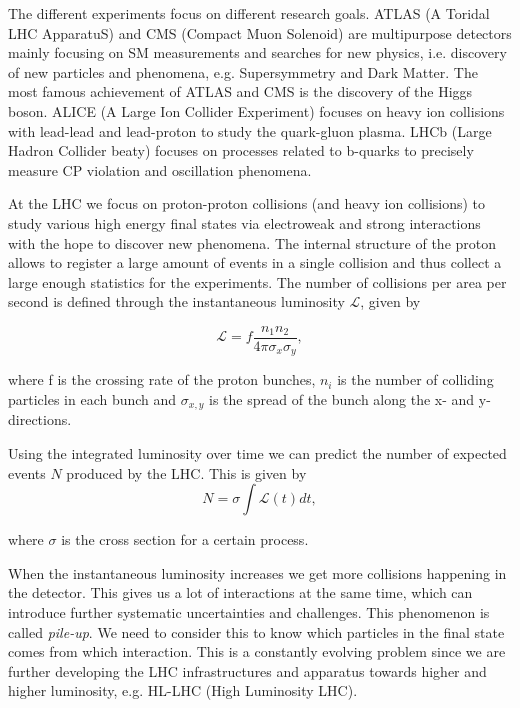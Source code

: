 The different experiments focus on different research goals. ATLAS (A Toridal LHC ApparatuS) and CMS (Compact
Muon Solenoid) are multipurpose detectors mainly focusing on SM measurements and searches for new physics, i.e. discovery of new particles and phenomena, e.g. Supersymmetry and Dark Matter. The most famous achievement of ATLAS and CMS is the discovery of the Higgs boson. ALICE (A Large Ion Collider Experiment) focuses on heavy ion collisions with lead-lead and lead-proton to study the quark-gluon plasma. LHCb (Large Hadron Collider beaty) focuses on processes related to b-quarks to precisely measure CP violation and oscillation phenomena. 

At the LHC we focus on proton-proton collisions (and heavy ion collisions) to study various high energy final states via electroweak and strong interactions with the hope to discover new phenomena. The internal structure of the proton allows to register a large amount of events in a single collision and thus collect a large enough statistics for the experiments. The number of collisions per area per second is defined through the instantaneous luminosity $\mathscr{L}$, given by

\begin{equation}
    \label{eq:lumi}
    \mathscr{L} = f \frac{n_1 n_2}{4 \pi \sigma_x \sigma_y},
\end{equation}

where f is the crossing rate of the proton bunches, $n_i$ is the number of colliding particles in each bunch and $\sigma_{x,y}$ is the spread of the bunch along the x- and y-directions.  

Using the integrated luminosity over time we can predict the number of expected events $N$ produced by the LHC. This is given by  
\begin{equation}
    \label{eq:intLumi}
    N = \sigma \int \mathscr{L}(t) dt, 
\end{equation}

where $\sigma$ is the cross section for a certain process. 

When the instantaneous luminosity increases we get more collisions happening in the detector. This gives us a lot of interactions at the same time, which can introduce further systematic uncertainties and challenges. This phenomenon is called \textit{pile-up}. We need to consider this to know which particles in the final state comes from which interaction. This is a constantly evolving problem since we are further developing the LHC infrastructures and apparatus towards higher and higher luminosity, e.g. HL-LHC (High Luminosity LHC). 

